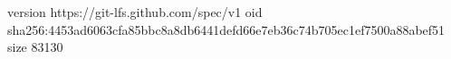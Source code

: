 version https://git-lfs.github.com/spec/v1
oid sha256:4453ad6063cfa85bbc8a8db6441defd66e7eb36c74b705ec1ef7500a88abef51
size 83130
